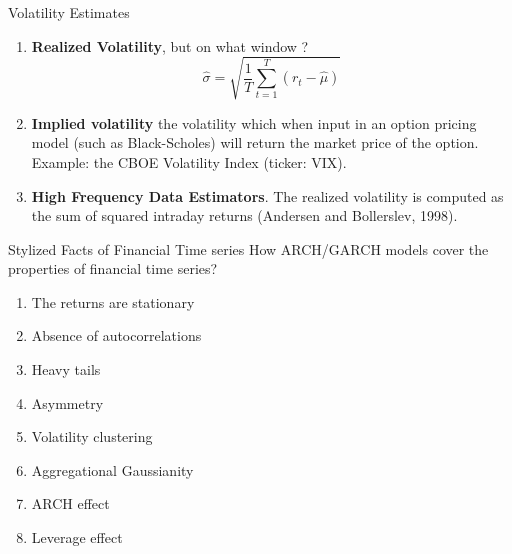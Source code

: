\documentclass{beamer}
\def\Esp{\mathbb{E}}
\newcommand{\imfbold}[1]{\textbf{\textcolor{imfblue}{#1}}}
\begin{document}
\begin{frame}{Volatility Estimates}
    \begin{enumerate}
    \item \imfbold{ Realized Volatility}, but on what window ?
        $$ \hat{\sigma} = \sqrt{ \frac{1}{T} \sum_{t=1}^T (r_t - \hat{\mu})}$$
    
    \item \imfbold{Implied volatility} the volatility which when input in an option pricing model (such as Black-Scholes) will return the market price of the option. Example: the CBOE Volatility Index (ticker: VIX).
    \item \imfbold{High Frequency Data Estimators}. The realized volatility is computed as the sum of squared intraday returns (Andersen and Bollerslev, 1998).
\end{enumerate}
\end{frame}

\begin{frame}{Stylized Facts of Financial Time series}
How ARCH/GARCH models cover the properties of financial time series?
    \begin{enumerate}
        \item The returns are stationary 
        \item Absence of autocorrelations 
        \item Heavy tails 
        \item Asymmetry
        \item Volatility clustering 
        \item Aggregational Gaussianity
        \item ARCH effect 
        \item Leverage effect
    \end{enumerate}
\end{frame}
\end{document}
